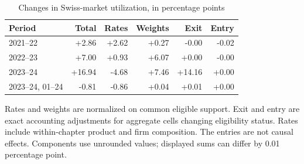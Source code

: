 \begin{table}[!htbp]
\centering
\caption{Changes in Swiss-market utilization, in percentage points}\label{tab:decomposition}
\small
\begin{tabular}{lrrrrr}
\toprule
Period & Total & Rates & Weights & Exit & Entry \\
\midrule
2021--22 & +2.86 & +2.62 & +0.27 & -0.00 & -0.02 \\
2022--23 & +7.00 & +0.93 & +6.07 & +0.00 & -0.00 \\
2023--24 & +16.94 & -4.68 & +7.46 & +14.16 & +0.00 \\
2023--24, 01--24 & -0.81 & -0.86 & +0.04 & +0.01 & +0.00 \\
\bottomrule
\end{tabular}
\par\vspace{3pt}\begin{minipage}{.97\linewidth}\footnotesize Rates and weights are normalized on common eligible support. Exit and entry are exact accounting adjustments for aggregate cells changing eligibility status. Rates include within-chapter product and firm composition. The entries are not causal effects. Components use unrounded values; displayed sums can differ by 0.01 percentage point.\end{minipage}
\end{table}
